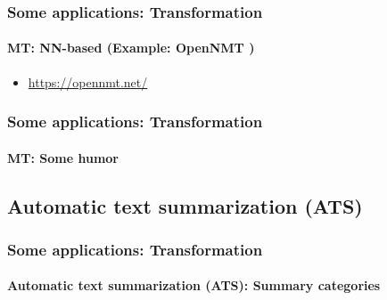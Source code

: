 \documentclass[xcolor=table]{beamer}
\begin{document}
\begin{frame}
	\frametitle{Some applications: Transformation}
	\framesubtitle{MT: NN-based (Example: OpenNMT \cite{17-klein-al})}
	\begin{itemize}
		\item \url{https://opennmt.net/}
	\end{itemize}
\end{frame}

\begin{frame}
	\frametitle{Some applications: Transformation}
	\framesubtitle{MT: Some humor}
	
	\begin{center}
	\end{center}
	
\end{frame}

\subsection{Automatic text summarization (ATS)}

\begin{frame}
	\frametitle{Some applications: Transformation}
	\framesubtitle{Automatic text summarization (ATS): Summary categories}
\end{frame}
\end{document}
